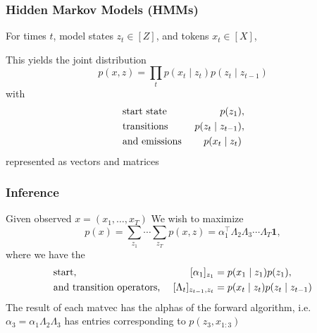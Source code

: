 \documentclass{beamer}
\begin{document}
\begin{frame}
\frametitle{Hidden Markov Models (HMMs)}

For times $t$, model states $z_t \in [Z]$, and tokens $x_t \in [X]$,

\begin{center}
\end{center}

This yields the joint distribution
$$p(x,z) = \prod_t p(x_t \mid z_t)p(z_t \mid z_{t-1})$$
%
with 
\begin{align*}
&\textnormal{start state } & p(z_1)&,\\
&\textnormal{transitions } & p(z_t \mid z_{t-1})&,\\
&\textnormal{and emissions } &  p(x_t \mid z_t)&
\end{align*}
represented as vectors and matrices

\end{frame}



\begin{frame}
\frametitle{Inference}
Given observed $x = (x_1, \ldots, x_T)$
\vspace{1em}
We wish to maximize
\begin{equation*}
p(x)
= \sum_{z_1}\cdots\sum_{z_T}p(x, z)
= \alpha_1^\top\Lambda_2\Lambda_3\cdots\Lambda_T\bm1,
\end{equation*}
where we have the
\begin{align*}
&\textnormal{start, } & [\alpha_1]_{z_1} &= p(x_1\mid z_1)p(z_1),\\
&\textnormal{and transition operators, }
    & [\Lambda_t]_{z_{t-1},z_t} &= p(x_t \mid z_t)p(z_t \mid z_{t-1})
\end{align*}
The result of each matvec has the alphas of the forward algorithm,
i.e. $\alpha_3 = \alpha_1\Lambda_2\Lambda_3$ has entries corresponding to $p(z_3, x_{1:3})$
\end{frame}
\end{document}
